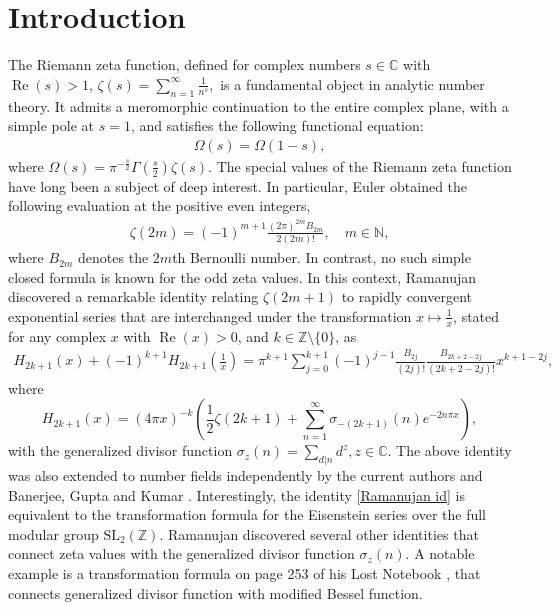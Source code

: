 \documentclass[12pt,reqno]{amsart}
\renewcommand{\Re}{\operatorname{Re}}
\renewcommand{\(}{\left\(}
\renewcommand{\)}{\right\)}
\renewcommand{\[}{\left\[}
\renewcommand{\]}{\right\]}
\numberwithin{equation}{section}
\theoremstyle{plain}
\begin{document}
\maketitle

\section{{\bf Introduction}}
The Riemann zeta function, defined for complex numbers $s\in \mathbb{C}$ with $\Re(s)>1$, 
$
\zeta(s) = \sum_{n=1}^{\infty}\frac{1}{n^s},
$
is a fundamental object in analytic number theory. It admits a meromorphic continuation to the entire complex plane, with a simple pole at $s=1$, and satisfies the following functional equation:
\begin{align}\label{zeta functional eqn}
\Omega(s) = \Omega(1-s),
\end{align}
where $\Omega(s) = \pi^{-\frac{s}{2}}\Gamma\left(\frac{s}{2}\right)\zeta(s)$.
The special values of the Riemann zeta function have long been a subject of deep interest. 
In particular, Euler obtained the following evaluation at the positive even integers,
\begin{align}\label{Euler's formula for even zeta values}
\zeta(2m) = (-1)^{m+1}\frac{(2\pi)^{2m}B_{2m}}{2(2m)!}, \quad m \in \mathbb{N},
\end{align}
where $B_{2m}$ denotes the $2m$th Bernoulli number.
In contrast, no such simple closed formula is known for the odd zeta values. In this context,
Ramanujan discovered a remarkable identity relating $\zeta(2m+1)$ to rapidly convergent exponential series that are interchanged under the transformation $x \mapsto \frac{1}{x}$, stated for any complex $x$ with $\Re(x)>0$, and $k \in \mathbb{Z} \setminus \{0\}$, as
\begin{align}\label{Ramanujan id}
H_{2k+1}(x) + (-1)^{k+1} H_{2k+1}\left(\frac{1}{x}\right) = \pi^{k+1}\sum^{k+1}_{j=0}(-1)^{j-1}\frac{B_{2j}}{(2j)!}\frac{B_{2k + 2 - 2j}}{(2k + 2 - 2j)!}x^{k+1-2j},
\end{align}
where $$H_{2k+1}(x) = (4\pi x)^{-k} \left( \frac{1}{2}\zeta(2k+1) + \sum_{n=1}^\infty \sigma_{-(2k+1)}(n)e^{-2n\pi x} \right),$$ 
with the generalized divisor function $\sigma_{z}(n) = \sum_{d|n}d^{z},
z \in \mathbb{C}$. The above identity was also extended to number fields independently by the current authors \cite{BM} and Banerjee, Gupta and Kumar \cite{BGK23}. Interestingly, the identity \eqref{Ramanujan id} is equivalent to the transformation formula for the Eisenstein series over the full modular group $\mathrm{SL}_2(\mathbb{Z})$. Ramanujan discovered several other identities that connect zeta values with the generalized divisor function $\sigma_{z}(n)$. A notable example is a transformation formula on page 253 of his Lost Notebook \cite{Ramanujan}, that connects generalized divisor function with modified Bessel function. 
\end{document}
